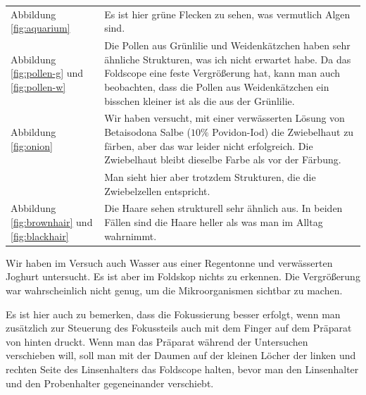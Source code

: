 		\begin{center}
			\renewcommand*{\arraystretch}{1.8}
			\begin{tabularx}{\textwidth}{l X}
				Abbildung \ref{fig:aquarium} 
					& Es ist hier grüne Flecken zu sehen, was vermutlich Algen sind. \\
				Abbildung \ref{fig:pollen-g} und \ref{fig:pollen-w} 
					& Die Pollen aus Grünlilie und Weidenkätzchen haben sehr ähnliche Strukturen, was ich nicht erwartet habe. Da das Foldscope eine feste Vergrößerung hat, kann man auch beobachten, dass die Pollen aus Weidenkätzchen ein bisschen kleiner ist als die aus der Grünlilie. \\
				Abbildung \ref{fig:onion} 
					& Wir haben versucht, mit einer verwässerten Lösung von Betaisodona Salbe ($10\%$ Povidon-Iod) die Zwiebelhaut zu färben, aber das war leider nicht erfolgreich. Die Zwiebelhaut bleibt dieselbe Farbe als vor der Färbung. \\[-0.5em]
					& Man sieht hier aber trotzdem Strukturen, die die Zwiebelzellen entspricht.  \\
				Abbildung \ref{fig:brownhair} und \ref{fig:blackhair} 
					& Die Haare sehen strukturell sehr ähnlich aus. In beiden Fällen sind die Haare heller als was man im Alltag wahrnimmt. 
			\end{tabularx}
		\end{center}
		Wir haben im Versuch auch Wasser aus einer Regentonne und verwässerten Joghurt untersucht. Es ist aber im Foldskop nichts zu erkennen. Die Vergrößerung war wahrscheinlich nicht genug, um die Mikroorganismen sichtbar zu machen. 

		Es ist hier auch zu bemerken, dass die Fokussierung besser erfolgt, wenn man zusätzlich zur Steuerung des Fokussteils auch mit dem Finger auf dem Präparat von hinten druckt. Wenn man das Präparat während der Untersuchen verschieben will, soll man mit der Daumen auf der kleinen Löcher der linken und rechten Seite des Linsenhalters das Foldscope halten, bevor man den Linsenhalter und den Probenhalter gegeneinander verschiebt.